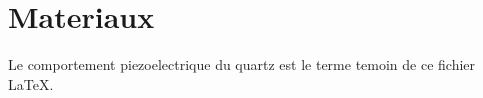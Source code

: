 \documentclass{article}
\begin{document}
\section{Materiaux}
Le comportement piezoelectrique du quartz est le terme temoin de ce
fichier \LaTeX{}.
\end{document}
